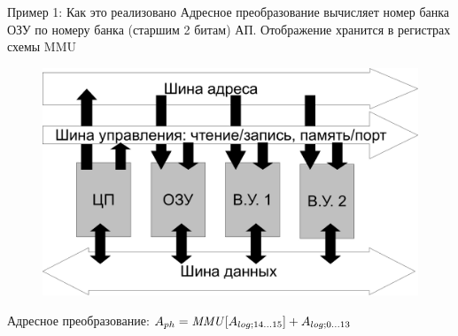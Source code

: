 \documentclass[xetex,aspectratio=43]{beamer}
\begin{document}
\begin{frame}{Пример 1: Как это реализовано}
    Адресное преобразование вычисляет номер банка ОЗУ по номеру банка
    (старшим 2 битам) АП. Отображение хранится в регистрах схемы MMU

    \begin{figure}
        \includegraphics[page=3,height=0.6\textheight]{img/06.Mem_Models-crop.pdf}
    \end{figure}

    Адресное преобразование:
    \(A_{ph} = \mathit{MMU}[A_{log\\; 14\ldots 15}] + A_{log\\; 0\dots 13}\)
\end{frame}
\end{document}
